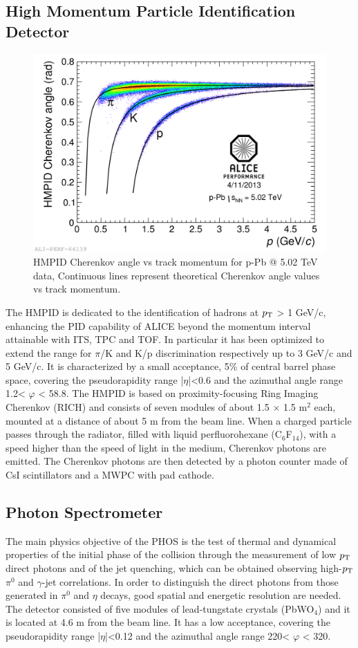 \subsection*{High Momentum Particle Identification Detector}
\begin{figure}
  \centering
  \includegraphics[scale=0.15]{figures/HMPID.png}
  \caption{HMPID Cherenkov angle vs track momentum for p-Pb @ 5.02 TeV data, Continuous lines represent theoretical Cherenkov angle values vs track momentum.}
  \label{fig:HMPID}
\end{figure}
%
The HMPID is dedicated to the identification of hadrons at $p_\text{T}$ > 1 GeV/c, enhancing the PID capability of ALICE beyond the momentum interval attainable with ITS, TPC and TOF. In particular it has been optimized to extend the range for $\pi$/K and K/p discrimination respectively up to 3 GeV/c and 5 GeV/c. It is characterized by a small acceptance, 5\% of central barrel phase space, covering the pseudorapidity range |$\eta$|<0.6 and the azimuthal angle range 1.2\textdegree < $\varphi$ < 58.8\textdegree. The HMPID is based on proximity-focusing Ring Imaging Cherenkov (RICH) and consists of seven modules of about 1.5 $\times$ 1.5 m$^2$ each, mounted at a distance of about 5 m from the beam line. When a charged particle passes through the radiator, filled with liquid perfluorohexane (C$_6$F$_{14}$), with a speed higher than the speed of light in the medium, Cherenkov photons are emitted. The Cherenkov photons are then detected by a photon counter made of CsI scintillators and a MWPC with pad cathode.
\subsection*{Photon Spectrometer}
The main physics objective of the PHOS is the test of thermal and dynamical properties of the initial phase of the collision through the measurement of low $p_\text{T}$ direct photons and of the jet quenching, which can be obtained observing high-$p_\text{T}$ $\pi^0$ and $\gamma$-jet correlations. In order to distinguish the direct photons from those generated in $\pi^0$ and $\eta$ decays, good spatial and energetic resolution are needed. The detector consisted of five modules of lead-tungstate crystals (PbWO$_4$) and it is located at 4.6 m from the beam line. It has a low acceptance, covering the pseudorapidity range |$\eta$|<0.12 and the azimuthal angle range 220\textdegree < $\varphi$ < 320\textdegree.
